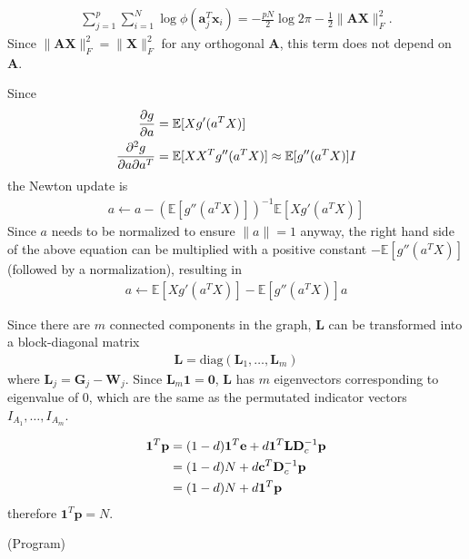 \begin{exercise}
  \begin{align}
    \sum_{j=1}^p\sum_{i=1}^N \log\phi(\mathbf{a}_j^T\mathbf{x}_i) =
    -\frac{pN}{2}\log 2\pi - \frac{1}{2}\|\mathbf{AX}\|_F^2.
  \end{align}
  Since $\|\mathbf{AX}\|_F^2 = \|\mathbf{X}\|_F^2$ for any orthogonal
  $\mathbf{A}$, this term does not depend on $\mathbf{A}$.
\end{exercise}

\begin{exercise}
  Since
  \begin{align}
    \pdv{g}{a} &= \mathbb{E}[Xg'(a^TX)]  \\
    \pdv{g}{a}{a^T} &= \mathbb{E}[XX^Tg''(a^TX)]\approx
    \mathbb{E}[g''(a^TX)]I
  \end{align}
  the Newton update is
  \begin{align}
    a \leftarrow a - (\mathbb{E}[g''(a^TX)])^{-1}\mathbb{E}[Xg'(a^TX)]
  \end{align}
  Since $a$ needs to be normalized to ensure $\|a\|=1$ anyway, the right hand
  side of the above equation can be multiplied with a positive constant
  $-\mathbb{E}[g''(a^TX)]$ (followed by a normalization), resulting in
  \begin{align}
    a \leftarrow \mathbb{E}[Xg'(a^TX)] - \mathbb{E}[g''(a^TX)]a
  \end{align}
\end{exercise}

\begin{exercise}
  Since there are $m$ connected components in the graph, $\mathbf{L}$ can be
  transformed into a block-diagonal matrix
  \begin{align}
    \mathbf{L} = \mbox{diag}(\mathbf{L}_1,\ldots, \mathbf{L}_m)
  \end{align}
  where $\mathbf{L}_j = \mathbf{G}_j - \mathbf{W}_j $. Since
  $\mathbf{L}_m\mathbf{1} = \mathbf{0}$, $\mathbf{L}$ has $m$ eigenvectors
  corresponding to eigenvalue of 0, which are the same as the permutated
  indicator vectors $I_{A_1},\ldots, I_{A_m}$.
\end{exercise}

\begin{exercise}
  \begin{exerciseSection}
    \begin{align}
      \mathbf{1}^T\mathbf{p} & = (1 - d)\mathbf{1}^T\mathbf{e} +
      d\mathbf{1}^T\mathbf{L}\mathbf{D}_c^{-1}\mathbf{p} \notag \\
      &= (1 - d)N + d\mathbf{c}^T\mathbf{D}_c^{-1}\mathbf{p} \notag \\
      &= (1 - d)N + d\mathbf{1}^T\mathbf{p}
    \end{align}
    therefore $\mathbf{1}^T\mathbf{p} = N$.
  \end{exerciseSection}
  
  \begin{exerciseSection}(Program)
  \end{exerciseSection}
\end{exercise}

